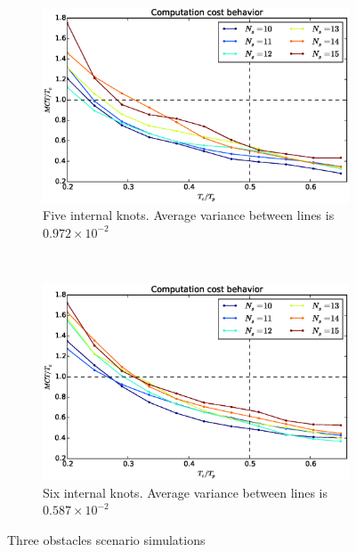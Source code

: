 \documentclass[eprint]{actapoly}
\begin{document}
\begin{figure}[!h]
        ~ %
        \begin{subfigure}[b]{0.48\textwidth}
                \includegraphics[width=\textwidth]{./images/realtime/Scenario_3__N_knots_5/mcttc-tctp.eps}
                \caption{Five internal knots. Average variance between lines is $0.972\times 10^{-2}$}\label{fig:uni35}
        \end{subfigure}
        ~ %
        \begin{subfigure}[b]{0.48\textwidth}
                \includegraphics[width=\textwidth]{./images/realtime/Scenario_3__N_knots_6/mcttc-tctp.eps}
                \caption{Six internal knots. Average variance between lines is $0.587\times 10^{-2}$}\label{fig:uni36}
        \end{subfigure}
        \caption{Three obstacles scenario simulations}\label{fig:uni3}
\end{figure}
\end{document}
